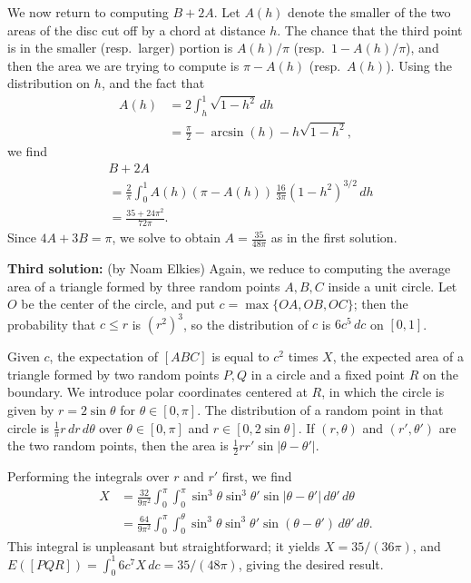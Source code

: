 \documentclass[amssymb,twocolumn,pra,10pt,aps]{revtex4-1}
\begin{document}
\begin{itemize}
We now return to computing $B +2A$.
Let $A(h)$ denote the smaller of the two areas of the disc cut off
by a chord at distance $h$.
The chance that the third point is in the smaller (resp.\
larger) portion is $A(h)/\pi$ (resp.\ $1 - A(h)/\pi$),
and then the area we are trying to compute is $\pi - A(h)$
(resp.\ $A(h)$).
Using the distribution on $h$,
and the fact that
\begin{align*}
A(h) &= 2 \int_h^1 \sqrt{1-h^2}\,dh \\
&= \frac{\pi}{2}  - \arcsin(h) - h \sqrt{1-h^2},
\end{align*}
we find
\begin{align*}
&B+2A \\
&= \frac{2}{\pi} \int_0^1 A(h) (\pi - A(h))\, \frac{16}{3\pi} (1-h^2)^{3/2}
\,dh \\
&= \frac{35 + 24 \pi^2}{72 \pi}.
\end{align*}
Since $4A + 3B = \pi$, we solve to obtain
$A = \frac{35}{48 \pi}$ as in the first solution.

\textbf{Third solution:} (by Noam Elkies)
Again, we reduce to computing the average area of a triangle formed by
three random points $A,B,C$ inside a unit circle.
Let $O$ be the center of the circle, and put $c = \max\{OA,OB,OC\}$;
then the probability that $c \leq r$ is $(r^2)^3$, so the distribution
of $c$ is $6c^5\,dc$ on $[0,1]$.

Given $c$, the expectation of $[ABC]$ is equal to $c^2$ times $X$, the expected
area of a triangle formed by two random points $P,Q$ in a circle and
a fixed point $R$ on the boundary. We introduce polar coordinates centered
at $R$, in which the circle is given by $r = 2 \sin \theta$ for
$\theta \in [0, \pi]$. The distribution of a random point in that circle is
$\frac{1}{\pi} r\,dr\,d\theta$ over $\theta \in [0,\pi]$ and
$r \in [0, 2 \sin \theta]$. If $(r,\theta)$ and $(r',\theta')$ are the
two random points, then the area is $\frac{1}{2} rr' \sin |\theta - \theta'|$.

Performing the integrals over $r$ and $r'$ first, we find
\begin{align*}
X &= \frac{32}{9 \pi^2} \int_0^\pi \int_0^\pi \sin^3 \theta \sin^3 \theta'
\sin |\theta-\theta'|\,d\theta'\,d\theta \\
&= \frac{64}{9 \pi^2} \int_0^\pi \int_0^\theta \sin^3 \theta \sin^3 \theta'
\sin (\theta-\theta') \,d\theta'\,d\theta.
\end{align*}
This integral is unpleasant but straightforward; it yields
$X = 35/(36 \pi)$, and
$E([PQR]) = \int_0^1 6c^7 X\,dc = 35/(48 \pi)$, giving the desired
result.


\end{itemize}
\end{document}
